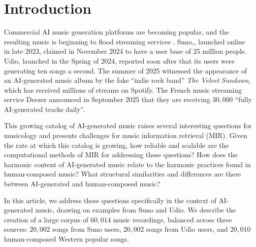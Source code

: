 \documentclass{article}
\begin{document}
\section{Introduction}
Commercial AI music generation platforms are becoming popular, and the resulting music is beginning to flood streaming services \citep{Sturm2024a}. Suno,, launched online in late 2023, claimed in November 2024 to have a user base of 25 million people. Udio,
launched in the Spring of 2024, reported soon after that its users were generating ten songs a second.
The summer of 2025 witnessed the appearance of an AI-generated music album by the fake ``indie rock band'' {\em The Velvet Sundown}, which has received millions of streams on Spotify.
The French music streaming service Deezer announced in September 2025 that they are receiving $30,000$ ``fully AI-generated tracks daily''.

This growing catalog of AI-generated music raises several interesting questions for musicology and presents challenges for music information retrieval (MIR). Given the rate at which this catalog is growing, how reliable and scalable are the computational methods of MIR for addressing these questions? How does the harmonic content of AI-generated music relate to the harmonic practices found in human-composed music? What structural similarities and differences are there between AI-generated and human-composed music?

In this article, we address these questions specifically in the context of AI-generated music, drawing on examples from Suno and Udio. We describe the creation of a large corpus of $60,014$ music recordings, balanced across three sources: $20,002$ songs from Suno users, $20,002$ songs from Udio users, and $20,010$ human-composed Western popular songs.
\end{document}
